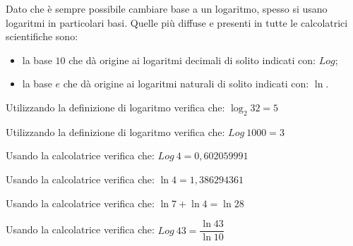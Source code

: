 \noindent
Dato che è sempre possibile cambiare base a un logaritmo, spesso si 
usano logaritmi in particolari basi. Quelle più diffuse e presenti in tutte 
le calcolatrici scientifiche sono: 
\begin{itemize}
 \item 
la base \quad \(10\) \quad che dà origine ai logaritmi decimali di solito 
indicati con: \(Log\);
 \item 
la base \quad \(e\) \quad che dà origine ai logaritmi naturali di solito 
indicati con: \(\ln\).
\end{itemize}

\begin{esempio}
 Utilizzando la definizione di logaritmo verifica che: \(\log_2 32 = 5\)
\end{esempio}

\begin{esempio}
 Utilizzando la definizione di logaritmo verifica che: \(Log~1000 = 3\)
\end{esempio}

\begin{esempio}
 Usando la calcolatrice verifica che: \(Log~4 = 0,602059991\)
\end{esempio}

\begin{esempio}
 Usando la calcolatrice verifica che: \(\ln 4 = 1,386294361\)
\end{esempio}

\begin{esempio}
 Usando la calcolatrice verifica che: \(\ln 7 + \ln 4 = \ln 28\)
\end{esempio}

\begin{esempio}
 Usando la calcolatrice verifica che: \(Log~43 = \dfrac{\ln 43}{\ln 10}\)
\end{esempio}

